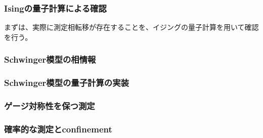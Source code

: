 \documentclass[a4paper,10.5pt]{article}
\numberwithin{equation}{section}
\begin{document}
\begin{enumerate}
\subsubsection{Isingの量子計算による確認}
まずは、実際に測定相転移が存在することを、イジングの量子計算を用いて確認を行う。
\subsubsection{Schwinger模型の相情報}
\subsubsection{Schwinger模型の量子計算の実装}
\subsubsection{ゲージ対称性を保つ測定}
\subsubsection{確率的な測定とconfinement}

\end{enumerate}
\end{document}
